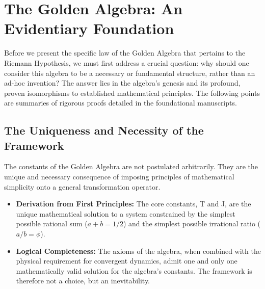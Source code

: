 \documentclass{article}
\theoremstyle{plain}
\theoremstyle{definition}
\theoremstyle{remark}
\begin{document}
\section{The Golden Algebra: An Evidentiary Foundation}
\label{sec:foundation}

Before we present the specific law of the Golden Algebra that pertains to the Riemann Hypothesis, we must first address a crucial question: why should one consider this algebra to be a necessary or fundamental structure, rather than an ad-hoc invention? The answer lies in the algebra's genesis and its profound, proven isomorphisms to established mathematical principles. The following points are summaries of rigorous proofs detailed in the foundational manuscripts.

\subsection{The Uniqueness and Necessity of the Framework}
The constants of the Golden Algebra are not postulated arbitrarily. They are the unique and necessary consequence of imposing principles of mathematical simplicity onto a general transformation operator.
\begin{itemize}
    \item \textbf{Derivation from First Principles:} The core constants, T and J, are the unique mathematical solution to a system constrained by the simplest possible rational sum ($a+b=1/2$) and the simplest possible irrational ratio ($a/b=\phi$).
    \item \textbf{Logical Completeness:} The axioms of the algebra, when combined with the physical requirement for convergent dynamics, admit one and only one mathematically valid solution for the algebra's constants. The framework is therefore not a choice, but an inevitability.
\end{itemize}
\end{document}
